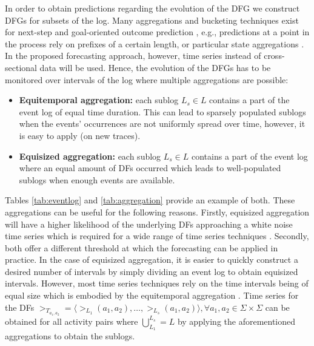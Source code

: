 In order to obtain predictions regarding the evolution of the DFG we construct DFGs for subsets of the log.
Many aggregations and bucketing techniques exist for next-step and goal-oriented outcome prediction \cite{DBLP:conf/caise/TaxVRD17,DBLP:journals/tkdd/TeinemaaDRM19}, e.g., predictions at a point in the process rely on prefixes of a certain length, or particular state aggregations \cite{DBLP:journals/sosym/AalstRVDKG10}.
In the proposed forecasting approach, however, time series instead of cross-sectional data will be used.
Hence, the evolution of the DFGs has to be monitored over intervals of the log where multiple aggregations are possible:
\begin{itemize}
	\item \textbf{Equitemporal aggregation:} each sublog $L_s\in L$ contains a part of the event log of equal time duration. This can lead to sparsely populated sublogs when the events' occurrences are not uniformly spread over time, however, it is easy to apply (on new traces).
	\item \textbf{Equisized aggregation:} each sublog $L_s\in L$ contains a part of the event log where an equal amount of DFs occurred which leads to well-populated sublogs when enough events are available.
\end{itemize}
Tables \ref{tab:eventlog} and \ref{tab:aggregation} provide an example of both.
These aggregations can be useful for the following reasons.
Firstly, equisized aggregation will have a higher likelihood of the underlying DFs approaching a white noise time series which is required for a wide range of time series techniques \cite{hyndman2018forecasting}. 
Secondly, both offer a different threshold at which the forecasting can be applied in practice.
In the case of equisized aggregation, it is easier to quickly construct a desired number of intervals by simply dividing an event log to obtain equisized intervals.
However, most time series techniques rely on the time intervals being of equal size which is embodied by the equitemporal aggregation \cite{kil1997optimum}.
Time series for the DFs $>_{T_{a_1,a_2}}=\langle >_{L_1}(a_1,a_2),\dots,>_{L_s}(a_1,a_2)\rangle, \forall a_1,a_2\in \Sigma\times\Sigma$ can be obtained for all activity pairs where $\bigcup^{L_s}_{L_1}=L$ by applying the aforementioned aggregations to obtain the sublogs.

